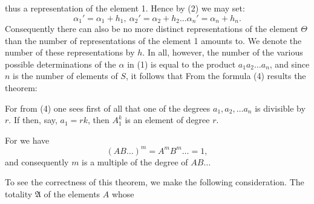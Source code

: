 thus a representation of the element 1. Hence by (2) we may set:
\[
\alpha_1' = \alpha_1 + h_1,\ \alpha_2' = \alpha_2 + h_2 \ldots \alpha_n' = \alpha_n + h_n.
\]
Consequently there can also be no more distinct representations of the element $\Theta$ than the number of representations of the element 1 amounts to. We denote the number of these representations by $h$. In all, however, the number of the various possible determinations of the $\alpha$ in (1) is equal to the product $a_1 a_2 \ldots a_n$, and since $n$ is the number of elements of $S$, it follows that
From the formula (4) results the theorem:


For from (4) one sees first of all that one of the degrees $a_1, a_2, \ldots a_n$ is divisible by $r$. If then, say, $a_1 = rk$, then $A_1^k$ is an element of degree $r$.


For we have
\[
(AB \ldots)^m = A^m B^m \ldots = 1,
\]
and consequently $m$ is a multiple of the degree of $AB \ldots$


To see the correctness of this theorem, we make the following consideration. The totality $\mathfrak{A}$ of the elements $A$ whose
